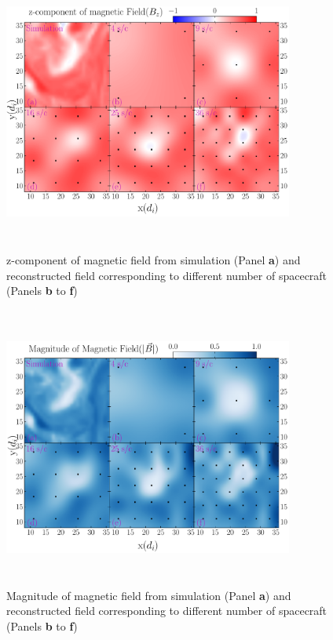         \begin{figure}
            \begin{center}
                \includegraphics[width=0.85\textwidth, height=3.65in]{figures/chap8/all_spc_bz_4_9_16_25_36_001_cas1.pdf}
                \caption[Reconstructed field (z-component), linear configuration]{z-component of
                magnetic field from simulation (Panel \textbf{a}) and reconstructed field
                corresponding to different number of spacecraft (Panels \textbf{b} to \textbf{f})}
                \label{fig:gpr_cas_bz}
            \end{center}
        \end{figure}

        \begin{figure}
            \begin{center}
                \includegraphics[width=0.85\textwidth, height=3.65in]{figures/chap8/all_spc_bm_4_9_16_25_36_001_cas1.pdf}
                \caption[Reconstructed field, linear configuration]{Magnitude of magnetic field from
                simulation (Panel \textbf{a}) and reconstructed field corresponding to different
                number of spacecraft (Panels \textbf{b} to \textbf{f})}
                \label{fig:gpr_cas_bm}
            \end{center}
        \end{figure}

